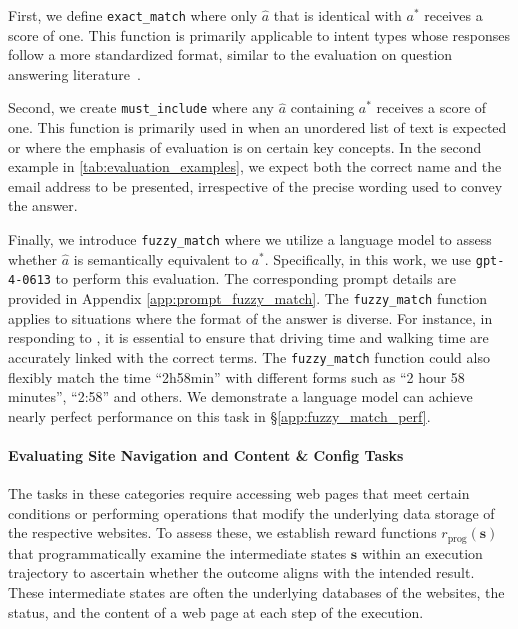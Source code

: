 First, we define \texttt{exact\_match} where only $\hat{a}$ that is identical with $a^*$ receives a score of one. This function is primarily applicable to intent types whose responses follow a more standardized format, similar to the evaluation on question answering literature~\citep{rajpurkar2016squad,yang2018hotpotqa}. 

Second, we create \texttt{must\_include} where any $\hat{a}$ containing $a^*$ receives a score of one. This function is primarily used in %
when %
an unordered list of text is expected or where the emphasis of evaluation is on certain key concepts. In the second example in \autoref{tab:evaluation_examples}, we expect both the correct name and the email address to be presented, irrespective of the precise wording used to convey the answer.

Finally, we introduce \texttt{fuzzy\_match} where we utilize a language model to assess whether $\hat{a}$ is semantically equivalent to $a^*$. 
Specifically, in this work, we use \texttt{gpt-4-0613} to perform this evaluation.
The corresponding prompt details are provided in Appendix \ref{app:prompt_fuzzy_match}. 
The \texttt{fuzzy\_match} function applies to situations where the format of the answer is diverse. For instance, in responding to , it is essential to ensure that driving time and walking time are accurately linked with the correct terms. 
The \texttt{fuzzy\_match} function could also flexibly match the time ``2h58min'' with different forms such as ``2 hour 58 minutes'', ``2:58'' and others. 
We demonstrate a language model can achieve nearly perfect performance on this task in \S\ref{app:fuzzy_match_perf}.

\paragraph{Evaluating Site Navigation and Content \& Config Tasks} The tasks in these categories require accessing web pages that meet certain conditions or performing operations that modify the underlying data storage of the respective websites. 
To assess these, we establish reward functions $r_{\textrm{prog}}(\mathbf{s})$ that programmatically examine the intermediate states $\mathbf{s}$ within an execution trajectory to ascertain whether the outcome aligns with the intended result.
These intermediate states are often the underlying databases of the websites, the status, and the content of a web page at each step of the execution. 

